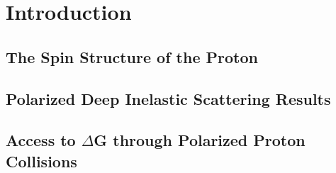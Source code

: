 \chapter{Introduction}

\section{The Spin Structure of the Proton}

\section{Polarized Deep Inelastic Scattering Results}

\section{Access to $\Delta$G through Polarized Proton Collisions}
